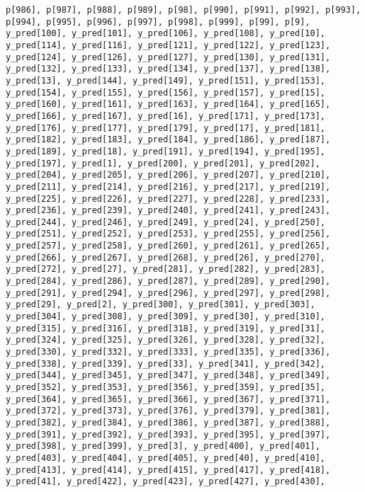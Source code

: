 \documentclass[
  letterpaper,
  DIV=11,
  numbers=noendperiod]{scrartcl}
\begin{document}
\begin{verbatim}
p[986], p[987], p[988], p[989], p[98], p[990], p[991], p[992], p[993],
p[994], p[995], p[996], p[997], p[998], p[999], p[99], p[9],
y_pred[100], y_pred[101], y_pred[106], y_pred[108], y_pred[10],
y_pred[114], y_pred[116], y_pred[121], y_pred[122], y_pred[123],
y_pred[124], y_pred[126], y_pred[127], y_pred[130], y_pred[131],
y_pred[132], y_pred[133], y_pred[134], y_pred[137], y_pred[138],
y_pred[13], y_pred[144], y_pred[149], y_pred[151], y_pred[153],
y_pred[154], y_pred[155], y_pred[156], y_pred[157], y_pred[15],
y_pred[160], y_pred[161], y_pred[163], y_pred[164], y_pred[165],
y_pred[166], y_pred[167], y_pred[16], y_pred[171], y_pred[173],
y_pred[176], y_pred[177], y_pred[179], y_pred[17], y_pred[181],
y_pred[182], y_pred[183], y_pred[184], y_pred[186], y_pred[187],
y_pred[189], y_pred[18], y_pred[191], y_pred[194], y_pred[195],
y_pred[197], y_pred[1], y_pred[200], y_pred[201], y_pred[202],
y_pred[204], y_pred[205], y_pred[206], y_pred[207], y_pred[210],
y_pred[211], y_pred[214], y_pred[216], y_pred[217], y_pred[219],
y_pred[225], y_pred[226], y_pred[227], y_pred[228], y_pred[233],
y_pred[236], y_pred[239], y_pred[240], y_pred[241], y_pred[243],
y_pred[244], y_pred[246], y_pred[249], y_pred[24], y_pred[250],
y_pred[251], y_pred[252], y_pred[253], y_pred[255], y_pred[256],
y_pred[257], y_pred[258], y_pred[260], y_pred[261], y_pred[265],
y_pred[266], y_pred[267], y_pred[268], y_pred[26], y_pred[270],
y_pred[272], y_pred[27], y_pred[281], y_pred[282], y_pred[283],
y_pred[284], y_pred[286], y_pred[287], y_pred[289], y_pred[290],
y_pred[291], y_pred[294], y_pred[296], y_pred[297], y_pred[298],
y_pred[29], y_pred[2], y_pred[300], y_pred[301], y_pred[303],
y_pred[304], y_pred[308], y_pred[309], y_pred[30], y_pred[310],
y_pred[315], y_pred[316], y_pred[318], y_pred[319], y_pred[31],
y_pred[324], y_pred[325], y_pred[326], y_pred[328], y_pred[32],
y_pred[330], y_pred[332], y_pred[333], y_pred[335], y_pred[336],
y_pred[338], y_pred[339], y_pred[33], y_pred[341], y_pred[342],
y_pred[344], y_pred[345], y_pred[347], y_pred[348], y_pred[349],
y_pred[352], y_pred[353], y_pred[356], y_pred[359], y_pred[35],
y_pred[364], y_pred[365], y_pred[366], y_pred[367], y_pred[371],
y_pred[372], y_pred[373], y_pred[376], y_pred[379], y_pred[381],
y_pred[382], y_pred[384], y_pred[386], y_pred[387], y_pred[388],
y_pred[391], y_pred[392], y_pred[393], y_pred[395], y_pred[397],
y_pred[398], y_pred[399], y_pred[3], y_pred[400], y_pred[401],
y_pred[403], y_pred[404], y_pred[405], y_pred[40], y_pred[410],
y_pred[413], y_pred[414], y_pred[415], y_pred[417], y_pred[418],
y_pred[41], y_pred[422], y_pred[423], y_pred[427], y_pred[430],

\end{verbatim}
\end{document}

